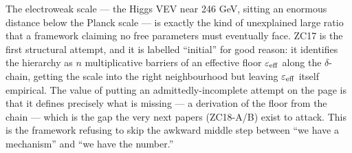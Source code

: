 \documentclass[12pt, a4paper]{article}
\begin{document}
The electroweak scale --- the Higgs VEV near 246 GeV, sitting an enormous
distance below the Planck scale --- is exactly the kind of unexplained large
ratio that a framework claiming no free parameters must eventually face. ZC17 is
the first structural attempt, and it is labelled ``initial'' for good reason: it
identifies the hierarchy as $n$ multiplicative barriers of an effective floor
$\varepsilon_{\rm eff}$ along the $\delta$-chain, getting the scale into the
right neighbourhood but leaving $\varepsilon_{\rm eff}$ itself empirical. The
value of putting an admittedly-incomplete attempt on the page is that it defines
precisely what is missing --- a derivation of the floor from the chain --- which
is the gap the very next papers (ZC18-A/B) exist to attack. This is the
framework refusing to skip the awkward middle step between ``we have a
mechanism'' and ``we have the number.''

\end{document}
